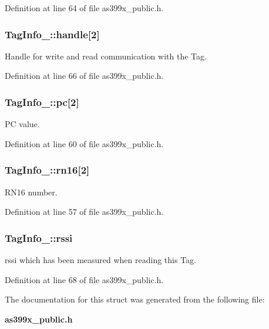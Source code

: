 Definition at line 64 of file as399x\-\_\-public.\-h.

\subsubsection[{handle}]{ Tag\-Info\-\_\-\-::handle[2]}\label{struct_tag_info___a2742a1f069416348b6b237a71835eaec}
Handle for write and read communication with the Tag. 

Definition at line 66 of file as399x\-\_\-public.\-h.

\subsubsection[{pc}]{ Tag\-Info\-\_\-\-::pc[2]}\label{struct_tag_info___a24d88fdb6496ffe6c07a0a9e35fdea56}
P\-C value. 

Definition at line 60 of file as399x\-\_\-public.\-h.

\subsubsection[{rn16}]{ Tag\-Info\-\_\-\-::rn16[2]}\label{struct_tag_info___ae6acf49a05714565182eb5619e81f77b}
R\-N16 number. 

Definition at line 57 of file as399x\-\_\-public.\-h.

\subsubsection[{rssi}]{ Tag\-Info\-\_\-\-::rssi}\label{struct_tag_info___a6978aed3305655c1839789b23800355a}
rssi which has been measured when reading this Tag. 

Definition at line 68 of file as399x\-\_\-public.\-h.



The documentation for this struct was generated from the following file\-:\begin{DoxyCompactItemize}
\item 
{\bf as399x\-\_\-public.\-h}\end{DoxyCompactItemize}
